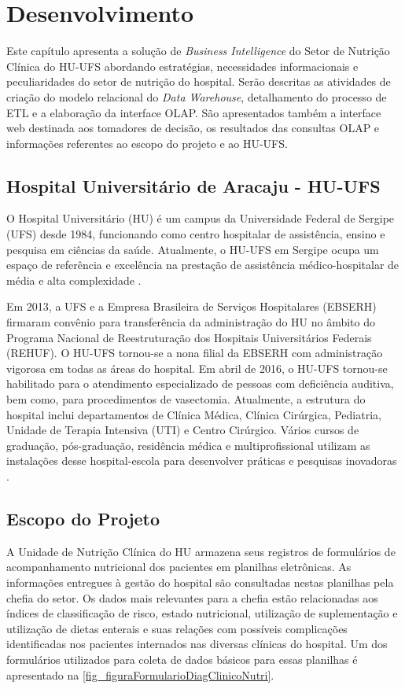 \chapter{Desenvolvimento}
Este capítulo apresenta a solução de \textit{Business Intelligence} do Setor de Nutrição Clínica do HU-UFS abordando estratégias, necessidades informacionais e peculiaridades do setor de nutrição do hospital. Serão descritas as atividades de criação do modelo relacional do \textit{Data Warehouse}, detalhamento do processo de ETL e a elaboração da interface OLAP. São apresentados também a interface web destinada aos tomadores de decisão, os resultados das consultas OLAP e informações referentes ao escopo do projeto e ao HU-UFS.
\section{Hospital Universitário de Aracaju - HU-UFS}
O Hospital Universitário (HU) é um campus da Universidade Federal de Sergipe (UFS) desde 1984, funcionando como centro hospitalar de assistência, ensino e pesquisa em ciências da saúde. Atualmente, o HU-UFS em Sergipe ocupa um espaço de referência e excelência na prestação de assistência médico-hospitalar de média e alta complexidade \cite{sitehuufs}.

Em 2013, a UFS e a Empresa Brasileira de Serviços Hospitalares (EBSERH) firmaram convênio para transferência da administração do HU no âmbito do Programa Nacional de Reestruturação dos Hospitais Universitários Federais (REHUF). O HU-UFS tornou-se a nona filial da EBSERH com administração vigorosa em todas as áreas do hospital. Em abril de 2016, o HU-UFS tornou-se habilitado para o atendimento especializado de pessoas com deficiência auditiva, bem como, para procedimentos de vasectomia. Atualmente, a estrutura do hospital inclui departamentos de Clínica Médica, Clínica Cirúrgica, Pediatria, Unidade de Terapia Intensiva (UTI) e Centro Cirúrgico. Vários cursos de graduação, pós-graduação, residência médica e multiprofissional utilizam as instalações desse hospital-escola para desenvolver práticas e pesquisas inovadoras \cite{sitehuufs}. 

\section{Escopo do Projeto}
A Unidade de Nutrição Clínica do HU armazena seus registros de formulários de acompanhamento nutricional dos pacientes em planilhas eletrônicas. As informações entregues à gestão do hospital são consultadas nestas planilhas pela chefia do setor. Os dados mais relevantes para a chefia estão relacionadas aos índices de classificação de risco, estado nutricional, utilização de suplementação e utilização de dietas enterais e suas relações com possíveis complicações identificadas nos pacientes internados nas diversas clínicas do hospital. Um dos formulários utilizados para coleta de dados básicos para essas planilhas é apresentado na \autoref{fig_figuraFormularioDiagClinicoNutri}.

